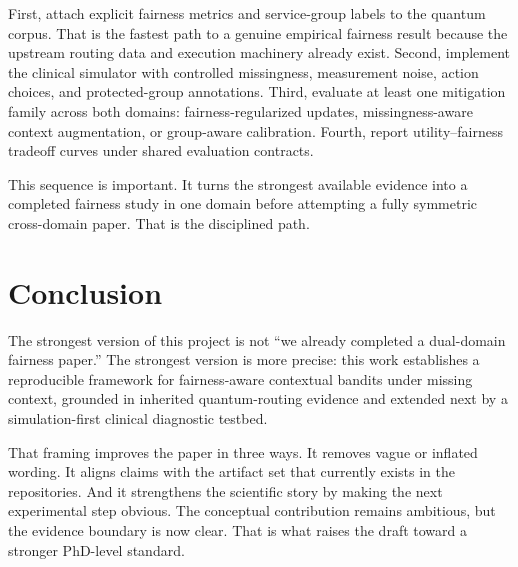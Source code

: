 \documentclass[conference]{IEEEtran}
\begin{document}
First, attach explicit fairness metrics and service-group labels to the quantum corpus. That is the fastest path to a genuine empirical fairness result because the upstream routing data and execution machinery already exist. Second, implement the clinical simulator with controlled missingness, measurement noise, action choices, and protected-group annotations. Third, evaluate at least one mitigation family across both domains: fairness-regularized updates, missingness-aware context augmentation, or group-aware calibration. Fourth, report utility--fairness tradeoff curves under shared evaluation contracts.

This sequence is important. It turns the strongest available evidence into a completed fairness study in one domain before attempting a fully symmetric cross-domain paper. That is the disciplined path.

\section{Conclusion}
The strongest version of this project is not ``we already completed a dual-domain fairness paper.'' The strongest version is more precise: this work establishes a reproducible framework for fairness-aware contextual bandits under missing context, grounded in inherited quantum-routing evidence and extended next by a simulation-first clinical diagnostic testbed.

That framing improves the paper in three ways. It removes vague or inflated wording. It aligns claims with the artifact set that currently exists in the repositories. And it strengthens the scientific story by making the next experimental step obvious. The conceptual contribution remains ambitious, but the evidence boundary is now clear. That is what raises the draft toward a stronger PhD-level standard.



\end{document}
